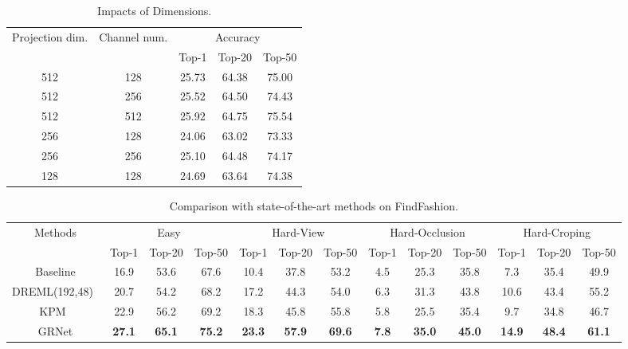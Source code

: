 \documentclass[10pt,twocolumn,letterpaper]{article}
\begin{document}
\begin{table}
\footnotesize
\center
\begin{center}
\begin{tabular}{c|c|c|c|c}
\hline
\multirow{2}{*}{Projection dim. } &  \multirow{2}{*}{Channel num. } &\multicolumn{3}{|c}{Accuracy} \\ \cline{3-5}
&&Top-1&Top-20&Top-50 \\ \hline
512&128&25.73&64.38&75.00  \\
512&256&25.52&64.50& 74.43 \\
512&512&25.92&64.75& 75.54 \\ \hline
256&128&24.06&63.02&73.33  \\
256&256&25.10&64.48& 74.17 \\ \hline
128&128&24.69&63.64&74.38
\\
\hline
\end{tabular}
 \vspace{-2mm}
\end{center}
\caption{Impacts of Dimensions.}
\label{tab:table_dim}
\end{table}
\begin{table*}[!htp]
\footnotesize
\center
\begin{center}
\begin{tabular}{c
|c|c|c
|c|c|c
|c|c|c
|c|c|c
}
\hline
\multirow{2}{*}{Methods} & \multicolumn{3}{|c|}{Easy}&\multicolumn{3}{|c|}{Hard-View}&\multicolumn{3}{|c|}{Hard-Occlusion}&\multicolumn{3}{|c}{Hard-Croping} \\ \cline{2-13}
&Top-1&Top-20&Top-50&Top-1&Top-20&Top-50&Top-1&Top-20&Top-50&Top-1&Top-20&Top-50 \\ \hline
Baseline &16.9 &53.6 &67.6 &10.4 &37.8 &53.2   & 4.5  &25.3 &35.8 &7.3 &35.4 &49.9 \\
DREML(192,48)~\cite{Xuan2018}         &20.7 &54.2 &68.2 &17.2 &44.3 &54.0 & 6.3 & 31.3 &43.8 &10.6 &43.4 &55.2 \\
KPM~\cite{Shen_2018_CVPR}         &22.9 &56.2 &69.2 &18.3 &45.8 &55.8 &5.8 &25.5 &35.4 &9.7 &34.8 &46.7 \\
GRNet&\textbf{27.1}&\textbf{65.1}&\textbf{75.2}
& \textbf{23.3}&\textbf{57.9}&\textbf{69.6}&
\textbf{7.8}&\textbf{35.0}&\textbf{45.0}
&\textbf{14.9}&\textbf{48.4}&\textbf{61.1}   \\
\hline
\end{tabular}
\vspace{-2mm}
\end{center}
\caption{Comparison with state-of-the-art methods on FindFashion.}
\label{tab:table_findfashion}
\end{table*}
\end{document}
